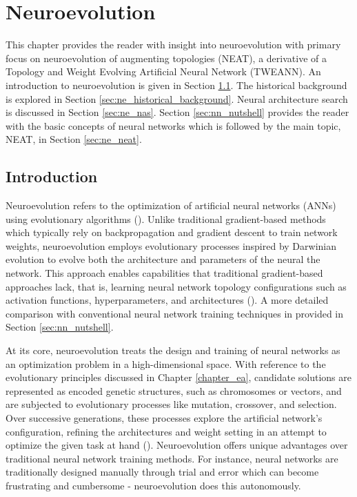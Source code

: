 \chapter{Neuroevolution}\label{chapter:neuroevolution}
This chapter provides the reader with insight into neuroevolution with primary focus on neuroevolution of augmenting topologies (NEAT), a derivative of a Topology and Weight Evolving Artificial Neural Network (TWEANN). An introduction to neuroevolution is given in Section \ref{sec:ne_introduction}. The historical background is explored in Section \ref{sec:ne_historical_background}. Neural architecture search is discussed in Section \ref{sec:ne_nas}. Section \ref{sec:nn_nutshell} provides the reader with the basic concepts of neural networks which is followed by the main topic, NEAT, in Section \ref{sec:ne_neat}.

\section{Introduction}\label{sec:ne_introduction}
Neuroevolution refers to the optimization of artificial neural networks (ANNs) using evolutionary algorithms (\cite{risi2015neuroevolution}). Unlike traditional gradient-based methods which typically rely on backpropagation and gradient descent to train network weights, neuroevolution employs evolutionary processes inspired by Darwinian evolution to evolve both the architecture and parameters of the neural the network. This approach enables capabilities that traditional gradient-based approaches lack, that is, learning neural network topology configurations such as activation functions, hyperparameters, and architectures (\cite{stanley2019designing}). A more detailed comparison with conventional neural network training techniques in provided in Section \ref{sec:nn_nutshell}.

\parbreak\noindent At its core, neuroevolution treats the design and training of neural networks as an optimization problem in a high-dimensional space. With reference to the evolutionary principles discussed in Chapter \ref{chapter_ea}, candidate solutions are represented as encoded genetic structures, such as chromosomes or vectors, and are subjected to evolutionary processes like mutation, crossover, and selection. Over successive generations, these processes explore the artificial network's configuration, refining the architectures and weight setting in an attempt to optimize the given task at hand (\cite{risi2015neuroevolution}). Neuroevolution offers unique advantages over traditional neural network training methods. For instance, neural networks are traditionally designed manually through trial and error which can become frustrating and cumbersome - neuroevolution does this autonomously.

